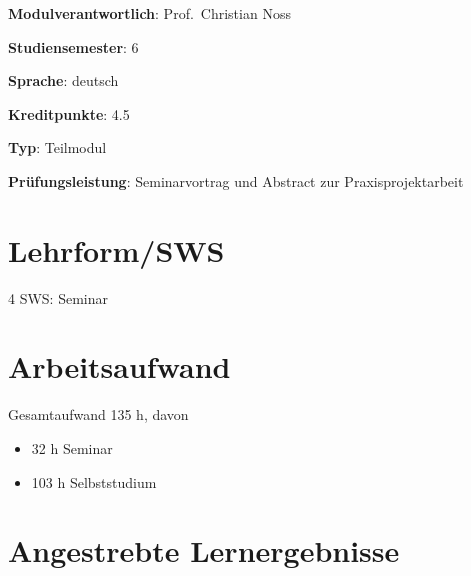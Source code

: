 \begin{modulHead}
\textbf{Modulverantwortlich}: Prof.~Christian
Noss
\end{modulHead}
\begin{modulHead}
\textbf{Studiensemester}:
6
\end{modulHead}
\begin{modulHead}
\textbf{Sprache}:
deutsch
\end{modulHead}
\begin{modulHead}
\textbf{Kreditpunkte}:
4.5
\end{modulHead}
\begin{modulHead}
\textbf{Typ}:
Teilmodul
\end{modulHead}
\begin{modulHead}
\textbf{Prüfungsleistung}:
Seminarvortrag und Abstract zur Praxisprojektarbeit
\end{modulHead}


\hypertarget{lehrformswspathlabelmi-2017modulbeschreibungen-bachelorba_praxisprojektseminar}{%
\section*{Lehrform/SWS\label{/mi-2017/modulbeschreibungen-bachelor/BA_Praxisprojektseminar}}\label{lehrformswspathlabelmi-2017modulbeschreibungen-bachelorba_praxisprojektseminar}}

4 SWS: Seminar

\hypertarget{arbeitsaufwandpathlabelmi-2017modulbeschreibungen-bachelorba_praxisprojektseminar}{%
\section*{Arbeitsaufwand\label{/mi-2017/modulbeschreibungen-bachelor/BA_Praxisprojektseminar}}\label{arbeitsaufwandpathlabelmi-2017modulbeschreibungen-bachelorba_praxisprojektseminar}}

Gesamtaufwand 135 h, davon

\begin{itemize}
\tightlist
\item
  32 h Seminar
\item
  103 h Selbststudium
\end{itemize}

\hypertarget{angestrebte-lernergebnissepathlabelmi-2017modulbeschreibungen-bachelorba_praxisprojektseminar}{%
\section*{Angestrebte
Lernergebnisse\label{/mi-2017/modulbeschreibungen-bachelor/BA_Praxisprojektseminar}}\label{angestrebte-lernergebnissepathlabelmi-2017modulbeschreibungen-bachelorba_praxisprojektseminar}}

